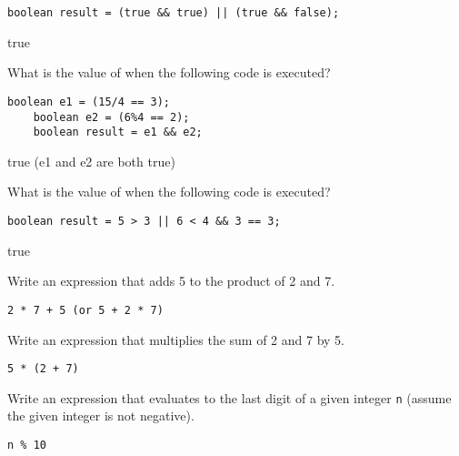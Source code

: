\begin{questions}
\begin{lstlisting}[basicstyle=\large]
	boolean result = (true && true) || (true && false);
\end{lstlisting}

\begin{solution}
true
\end{solution}

\question What is the value of  when the following code is executed?

\begin{lstlisting}[basicstyle=\large]
	boolean e1 = (15/4 == 3);
	boolean e2 = (6%4 == 2);
	boolean result = e1 && e2;
\end{lstlisting}

\begin{solution}
true (e1 and e2 are both true)
\end{solution}

\question What is the value of  when the following code is executed?

\begin{lstlisting}[basicstyle=\large]
	boolean result = 5 > 3 || 6 < 4 && 3 == 3;
\end{lstlisting}

\begin{solution}
true
\end{solution}

\question Write an expression that adds 5 to the product of 2 and 7.

\begin{solution}
\begin{lstlisting}
2 * 7 + 5 (or 5 + 2 * 7)
\end{lstlisting}
\end{solution}

\question Write an expression that multiplies the sum of 2 and 7 by 5.

\begin{solution}
\begin{lstlisting}	
5 * (2 + 7)
\end{lstlisting}
\end{solution}

\question Write an expression that evaluates to the last digit of a given integer \texttt{n} (assume the given integer is not negative).

\begin{solution}
\begin{lstlisting}	
n % 10
\end{lstlisting}
\end{solution}


\end{questions}
